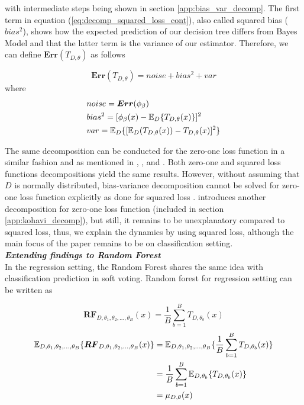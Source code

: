 with intermediate steps being shown in section \ref{app:bias_var_decomp}.
The first term in equation (\ref{eq:decomp_squared_loss_cont}), also called squared bias ($bias^2$),
shows how the expected prediction of our decision tree differs from Bayes Model 
and that the latter term is the variance of our estimator. 
Therefore, we can define $\boldsymbol{Err}(T_{D,\theta})$ as follows

\begin{equation}
\boldsymbol{Err}(T_{D,\theta}) = noise + bias^2 + var
\end{equation}
\vspace{-3mm}
\qquad \qquad \qquad \quad where
\vspace{-6.3mm}
\begin{align}
& noise = \boldsymbol{Err}(\phi_{\beta}) \notag \\
& bias^2 = [\phi_{\beta}(x) - \mathbb{E}_{D}\{T_{D,\theta}(x)\}]^2 \notag \\
& var = \mathbb{E}_{D}\{[\mathbb{E}_{D}(T_{D,\theta}(x)) - T_{D,\theta}(x)]^2\} \notag
\end{align}

The same decomposition can be conducted for the zero-one loss function in a similar fashion and as mentioned in 
\cite{louppe2014understanding}, \cite{domingos2000decomposition}, 
\cite{james2003variance} and \cite{friedman1997zeroLoss}.
Both zero-one and squared loss functions decompositions yield the same results. 
However, without assuming that $D$ is normally distributed, bias-variance decomposition 
cannot be solved for zero-one loss function explicitly as done for squared loss \cite{louppe2014understanding}. 
\cite{kohavi1996bias} introduces another decomposition for zero-one loss function (included in section \ref{app:kohavi_decomp}), 
but still, it remains to be unexplanatory compared to squared loss, thus, 
we explain the dynamics by using squared loss, although the main focus of the paper remains to be on classification setting.
\vspace{2mm}
\\
\textbf{\emph{Extending findings to Random Forest }}\\
In the regression setting, the Random Forest shares the same idea with classification prediction in soft voting. 
Random forest for regression setting can be written as

\begin{equation}
\boldsymbol{RF}_{D, \theta_{1},\theta_{2},..., \theta_{B}}(x) = \dfrac{1}{B}\sum_{b = 1}^{B}T_{D,\theta_{b}}(x)
\end{equation}
\begin{align}\label{eq:mu}
\mathbb{E}_{D, \theta_{1}, \theta_{2},..., \theta_{B}}\{\boldsymbol{RF}_{D, \theta_{1},\theta_{2},..., \theta_{B}}(x) \} 
	& = \mathbb{E}_{D, \theta_{1}, \theta_{2},..., \theta_{B}}\{\dfrac{1}{B}\sum_{b = 1}^{B}T_{D,\theta_{b}}(x)\} \notag \\
	& = \dfrac{1}{B}\sum_{b=1}^{B}\mathbb{E}_{D,\theta_{b}}\{T_{D, \theta_{b}}(x)\}\notag \\
	& = \mu_{D,\theta}(x)
\end{align}


